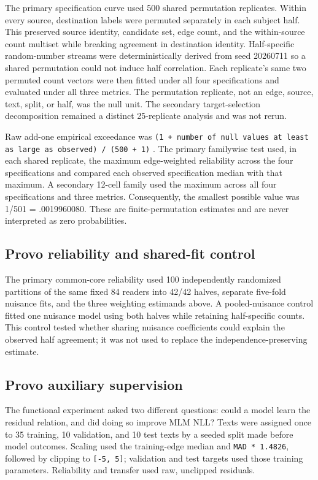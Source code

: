 \documentclass[11pt]{article}
\begin{document}
The primary specification curve used 500 shared permutation replicates. Within every source, destination labels were permuted separately in each subject half. This preserved source identity, candidate set, edge count, and the within-source count multiset while breaking agreement in destination identity. Half-specific random-number streams were deterministically derived from seed 20260711 so a shared permutation could not induce half correlation. Each replicate's same two permuted count vectors were then fitted under all four specifications and evaluated under all three metrics. The permutation replicate, not an edge, source, text, split, or half, was the null unit. The secondary target-selection decomposition remained a distinct 25-replicate analysis and was not rerun.

Raw add-one empirical exceedance was \texttt{(1 + number of null values at least as large as observed) / (500 + 1)} \citep{phipson2010}. The primary familywise test used, in each shared replicate, the maximum edge-weighted reliability across the four specifications and compared each observed specification median with that maximum. A secondary 12-cell family used the maximum across all four specifications and three metrics. Consequently, the smallest possible value was 1/501 = .0019960080. These are finite-permutation estimates and are never interpreted as zero probabilities.

\subsection{Provo reliability and shared-fit control}

The primary common-core reliability used 100 independently randomized partitions of the same fixed 84 readers into 42/42 halves, separate five-fold nuisance fits, and the three weighting estimands above. A pooled-nuisance control fitted one nuisance model using both halves while retaining half-specific counts. This control tested whether sharing nuisance coefficients could explain the observed half agreement; it was not used to replace the independence-preserving estimate.

\subsection{Provo auxiliary supervision}

The functional experiment asked two different questions: could a model learn the residual relation, and did doing so improve MLM NLL? Texts were assigned once to 35 training, 10 validation, and 10 test texts by a seeded split made before model outcomes. Scaling used the training-edge median and \texttt{MAD * 1.4826}, followed by clipping to \texttt{[-5, 5]}; validation and test targets used those training parameters. Reliability and transfer used raw, unclipped residuals.
\end{document}
